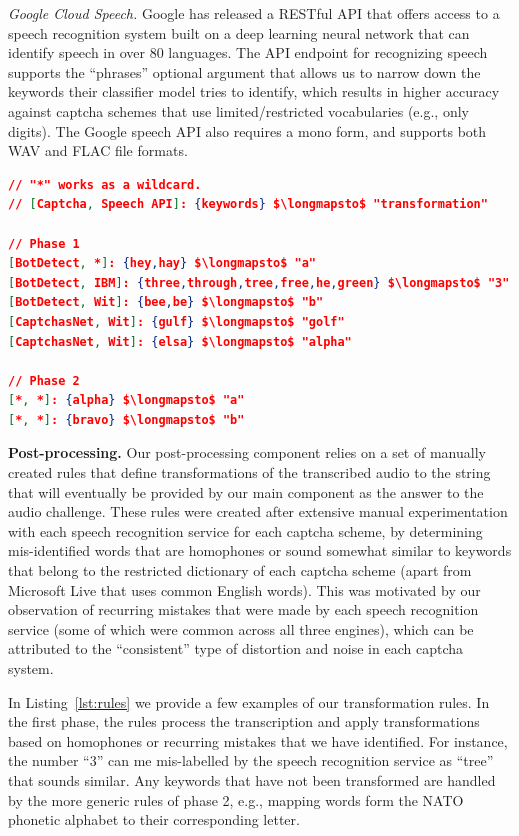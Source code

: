 \emph{Google Cloud Speech.}  Google has released a RESTful API that offers access to a speech recognition system built on 
a deep learning neural network that can identify speech in over 80 languages. The API endpoint for recognizing speech supports
the ``phrases'' optional argument that allows us to narrow down the keywords their classifier model tries to identify, which 
results in higher accuracy against captcha schemes that use limited/restricted vocabularies (e.g., only digits). The Google
speech API also requires a mono form, and supports both WAV and FLAC file formats.

\begin{lstlisting}[language=json,firstnumber=1,mathescape=true,caption={Subset of rules used by our post-processing component for
converting keywords in the transcription to the required transformation for the captcha's solution.},label={lst:rules}]
// "*" works as a wildcard. 
// [Captcha, Speech API]: {keywords} $\longmapsto$ "transformation"

// Phase 1
[BotDetect, *]: {hey,hay} $\longmapsto$ "a"
[BotDetect, IBM]: {three,through,tree,free,he,green} $\longmapsto$ "3"
[BotDetect, Wit]: {bee,be} $\longmapsto$ "b"
[CaptchasNet, Wit]: {gulf} $\longmapsto$ "golf"
[CaptchasNet, Wit]: {elsa} $\longmapsto$ "alpha"

// Phase 2
[*, *]: {alpha} $\longmapsto$ "a"
[*, *]: {bravo} $\longmapsto$ "b"
\end{lstlisting}

\textbf{Post-processing.} Our post-processing component relies on a set of manually created rules that define transformations
of the transcribed audio to the string that will eventually be provided by our main component as the answer to the audio challenge.
These rules were created after extensive manual experimentation with each speech recognition service for each captcha scheme,
by determining mis-identified words that are homophones or sound somewhat similar to keywords that belong to the 
restricted dictionary of each captcha scheme (apart from Microsoft Live that uses common English words). This was motivated
by our observation of recurring mistakes that were made by each speech recognition service (some of which were common across
all three engines), which can be attributed to the ``consistent'' type of distortion and noise in each captcha system.

In Listing~\ref{lst:rules} we provide a few examples of our transformation rules. In the first phase, the rules process the 
transcription and apply transformations based on homophones or recurring mistakes that we have identified. For instance, 
the number ``3'' can me mis-labelled by the speech recognition service as ``tree'' that sounds similar.
Any keywords that have not been transformed are handled by the more generic rules of phase 2, e.g., mapping 
words form the NATO phonetic alphabet to their corresponding letter.

